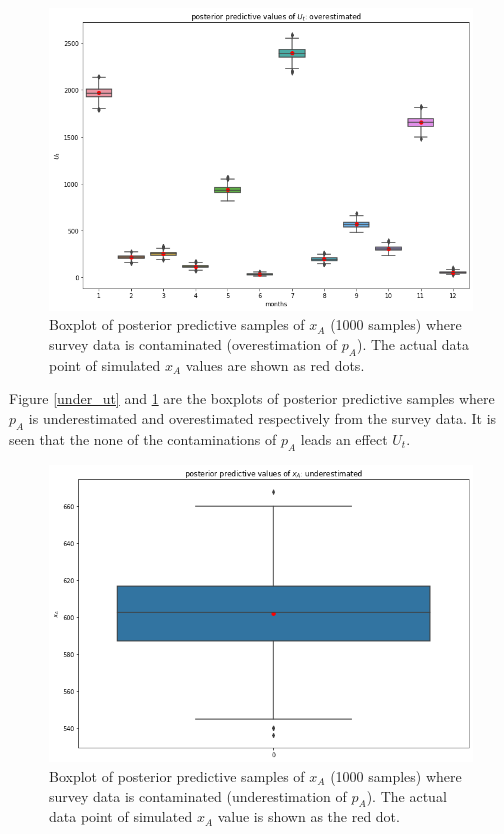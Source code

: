 \documentclass[
10pt, %
a4paper, %
oneside, %
headinclude,footinclude, %
BCOR5mm, %
]{scrartcl}
\begin{document}
\begin{figure}[htb]
	\centering
	\includegraphics[width=1\linewidth]{Figures/early_contamination_over-ut.png}
	\caption{Boxplot of posterior predictive samples of $x_A$ (1000 samples) where survey data is contaminated (overestimation of $p_A$).  The actual data point of simulated $x_A$ values are shown as red dots.}
	\label{over_ut}
\end{figure}

Figure \ref{under_ut} and \ref{over_ut} are the boxplots of posterior predictive samples where $p_A$ is underestimated and overestimated respectively from the survey data. It is seen that the none of the contaminations of $p_A$ leads an effect  $U_t$.\\

\begin{figure}[htb]
	\centering
	\includegraphics[width=1\linewidth]{Figures/early_contamination_under-xa.png}
	\caption{Boxplot of posterior predictive samples of $x_A$ (1000 samples) where survey data is contaminated (underestimation of $p_A$).  The actual data point of simulated $x_A$ value is shown as the red dot.}
	\label{under_xa}
\end{figure}
\end{document}
